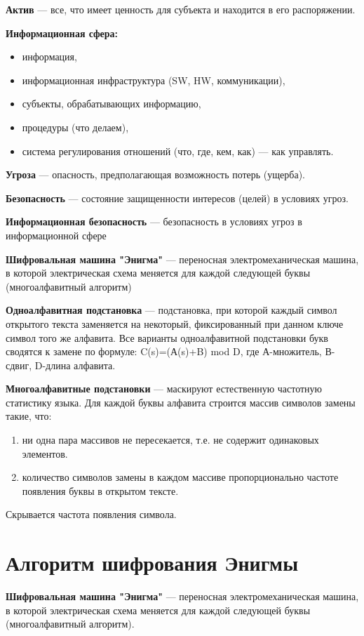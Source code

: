 \textbf{Актив} ---  все, что имеет ценность для субъекта и находится в его распоряжении.

\textbf{Информационная сфера:}
\begin{itemize}
    \item информация,
    \item информационная инфраструктура (SW, HW, коммуникации),
    \item субъекты, обрабатывающих информацию,
    \item процедуры (что делаем),
    \item система регулирования отношений (что, где, кем, как) --- как управлять.
\end{itemize}

\textbf{Угроза} --- опасность, предполагающая возможность потерь (ущерба).

\textbf{Безопасность} --- состояние защищенности интересов (целей) в условиях угроз.

\textbf{Информационная безопасность} --- безопасность в условиях угроз в информационной сфере

\textbf{Шифровальная машина "Энигма"} --- переносная электромеханическая машина, в которой электрическая схема меняется для каждой следующей буквы (многоалфавитный алгоритм)


\textbf{Одноалфавитная подстановка} --- подстановка, при которой каждый символ открытого текста заменяется на некоторый, фиксированный при данном ключе символ того же алфавита. Все варианты одноалфавитной подстановки букв сводятся к замене по формуле:
C(s)=(А(s)+B) mod D, где А-множитель, В-сдвиг, D-длина алфавита.

\textbf{Многоалфавитные подстановки} --- маскируют естественную частотную статистику языка. Для каждой буквы алфавита строится массив символов замены такие, что:
\begin{enumerate}
    \item ни одна пара массивов не пересекается, т.е. не содержит одинаковых элементов.
    \item количество символов замены в каждом массиве пропорционально частоте появления буквы в открытом тексте.
\end{enumerate}
Скрывается частота появления символа.

\section{Алгоритм шифрования Энигмы}

\textbf{Шифровальная машина "Энигма"} --- переносная электромеханическая машина, в которой электрическая схема меняется для каждой следующей буквы (многоалфавитный алгоритм).

